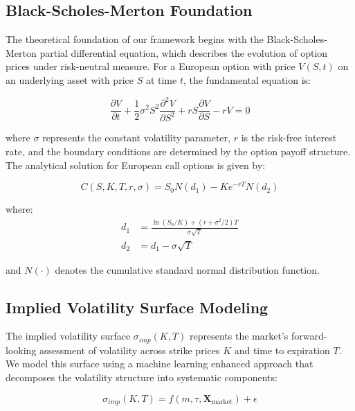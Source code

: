 \documentclass[12pt,a4paper]{article}
\begin{document}
\subsection{Black-Scholes-Merton Foundation}

The theoretical foundation of our framework begins with the Black-Scholes-Merton partial differential equation, which describes the evolution of option prices under risk-neutral measure. For a European option with price $V(S,t)$ on an underlying asset with price $S$ at time $t$, the fundamental equation is:

\begin{equation}
\frac{\partial V}{\partial t} + \frac{1}{2}\sigma^2 S^2 \frac{\partial^2 V}{\partial S^2} + rS\frac{\partial V}{\partial S} - rV = 0
\label{eq:bs_pde}
\end{equation}

where $\sigma$ represents the constant volatility parameter, $r$ is the risk-free interest rate, and the boundary conditions are determined by the option payoff structure. The analytical solution for European call options is given by:

\begin{equation}
C(S,K,T,r,\sigma) = S_0 N(d_1) - Ke^{-rT} N(d_2)
\label{eq:bs_call}
\end{equation}

where:
\begin{align}
d_1 &= \frac{\ln(S_0/K) + (r + \sigma^2/2)T}{\sigma\sqrt{T}} \\
d_2 &= d_1 - \sigma\sqrt{T}
\end{align}

and $N(\cdot)$ denotes the cumulative standard normal distribution function.

\subsection{Implied Volatility Surface Modeling}

The implied volatility surface $\sigma_{imp}(K,T)$ represents the market's forward-looking assessment of volatility across strike prices $K$ and time to expiration $T$. We model this surface using a machine learning enhanced approach that decomposes the volatility structure into systematic components:

\begin{equation}
\sigma_{imp}(K,T) = f(m, \tau, \mathbf{X}_{\text{market}}) + \epsilon
\label{eq:iv_surface}
\end{equation}
\end{document}
